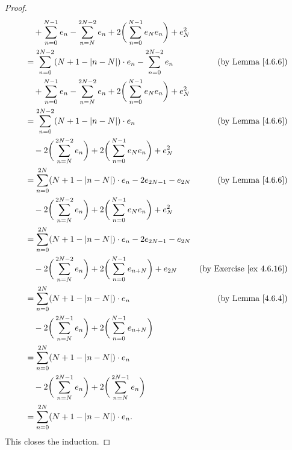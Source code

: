 \begin{proof}
\begin{align*}
         & \quad + \sum_{n = 0}^{N - 1} e_n - \sum_{n = N}^{2N - 2} e_n + 2 \bigg(\sum_{n = 0}^{N - 1} e_N e_n\bigg) + e_N^2                                        \\
         & = \sum_{n = 0}^{2N - 2} (N + 1 - \abs*{n - N}) \cdot e_n - \sum_{n = 0}^{2N - 2} e_n                              & \text{(by Lemma \ref{4.6.6})}        \\
         & \quad + \sum_{n = 0}^{N - 1} e_n - \sum_{n = N}^{2N - 2} e_n + 2 \bigg(\sum_{n = 0}^{N - 1} e_N e_n\bigg) + e_N^2                                        \\
         & = \sum_{n = 0}^{2N - 2} (N + 1 - \abs*{n - N}) \cdot e_n                                                          & \text{(by Lemma \ref{4.6.6})}        \\
         & \quad - 2 \bigg(\sum_{n = N}^{2N - 2} e_n\bigg) + 2 \bigg(\sum_{n = 0}^{N - 1} e_N e_n\bigg) + e_N^2                                                     \\
         & = \sum_{n = 0}^{2N} (N + 1 - \abs*{n - N}) \cdot e_n - 2 e_{2N - 1} - e_{2N}                                      & \text{(by Lemma \ref{4.6.6})}        \\
         & \quad - 2 \bigg(\sum_{n = N}^{2N - 2} e_n\bigg) + 2 \bigg(\sum_{n = 0}^{N - 1} e_N e_n\bigg) + e_N^2                                                     \\
         & = \sum_{n = 0}^{2N} (N + 1 - \abs*{n - N}) \cdot e_n - 2 e_{2N - 1} - e_{2N}                                                                             \\
         & \quad - 2 \bigg(\sum_{n = N}^{2N - 2} e_n\bigg) + 2 \bigg(\sum_{n = 0}^{N - 1} e_{n + N}\bigg) + e_{2N}           & \text{(by Exercise \ref{ex 4.6.16})} \\
         & = \sum_{n = 0}^{2N} (N + 1 - \abs*{n - N}) \cdot e_n                                                              & \text{(by Lemma \ref{4.6.4})}        \\
         & \quad - 2 \bigg(\sum_{n = N}^{2N - 1} e_n\bigg) + 2 \bigg(\sum_{n = 0}^{N - 1} e_{n + N}\bigg)                                                           \\
         & = \sum_{n = 0}^{2N} (N + 1 - \abs*{n - N}) \cdot e_n                                                                                                     \\
         & \quad - 2 \bigg(\sum_{n = N}^{2N - 1} e_n\bigg) + 2 \bigg(\sum_{n = N}^{2N - 1} e_n\bigg)                                                                \\
         & = \sum_{n = 0}^{2N} (N + 1 - \abs*{n - N}) \cdot e_n.
    \end{align*}
    This closes the induction.


\end{proof}
